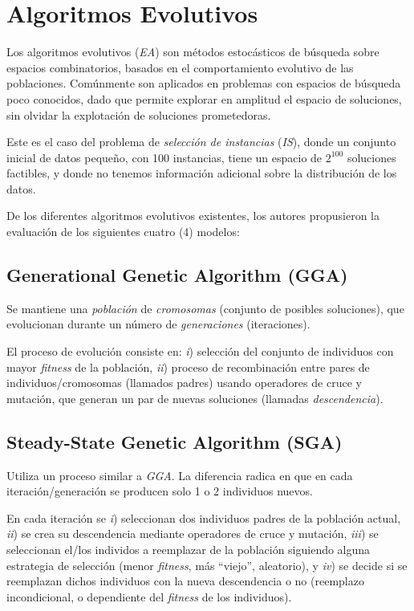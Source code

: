 \chapter{Algoritmos Evolutivos}
\label{capitulo2}

Los algoritmos evolutivos (\emph{EA}) son métodos estocásticos de búsqueda sobre espacios combinatorios, basados en el comportamiento evolutivo de las poblaciones. Comúnmente son aplicados en problemas con espacios de búsqueda poco conocidos, dado que permite explorar en amplitud el espacio de soluciones, sin olvidar la explotación de soluciones prometedoras.

Este es el caso del problema de \emph{selección de instancias} (\emph{IS}), donde un conjunto inicial de datos pequeño, con 100 instancias, tiene un espacio de $2^{100}$ soluciones factibles, y donde no tenemos información adicional sobre la distribución de los datos.

De los diferentes algoritmos evolutivos existentes, los autores propusieron la evaluación de los siguientes cuatro (4) modelos:

\section{Generational Genetic Algorithm (GGA)}

Se mantiene una \emph{población} de \emph{cromosomas} (conjunto de posibles soluciones), que evolucionan durante un número de \emph{generaciones} (iteraciones).

El proceso de evolución consiste en: \emph{i}) selección del conjunto de individuos con mayor \emph{fitness} de la población, \emph{ii}) proceso de recombinación entre pares de individuos/cromosomas (llamados padres) usando operadores de cruce y mutación, que generan un par de nuevas soluciones (llamadas \emph{descendencia}).

\section{Steady-State Genetic Algorithm (SGA)}

Utiliza un proceso similar a \emph{GGA}. La diferencia radica en que en cada iteración/generación se producen solo 1 o 2 individuos nuevos.

En cada iteración se \emph{i}) seleccionan dos individuos padres de la población actual, \emph{ii}) se crea su descendencia mediante operadores de cruce y mutación, \emph{iii}) se seleccionan el/los individos a reemplazar de la población siguiendo alguna estrategia de selección (menor \emph{fitness}, más ``viejo'', aleatorio), y \emph{iv}) se decide si se reemplazan dichos individuos con la nueva descendencia o no (reemplazo incondicional, o dependiente del \emph{fitness} de los individuos).

